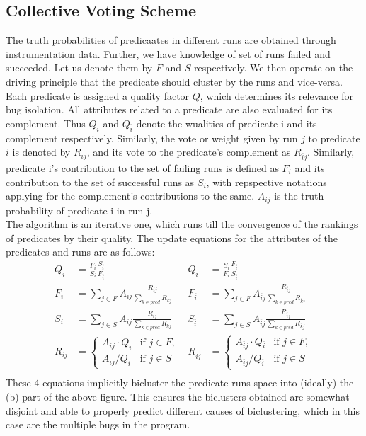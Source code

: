 \documentclass[a4paper,10pt, margin=0.75in]{article}
\begin{document}
\subsection{Collective Voting Scheme}
The truth probabilities of predicaates in different runs are obtained through instrumentation data. Further, we have knowledge of set of runs failed and succeeded. Let us denote them by $F$ and $S$ respectively. We then operate on the driving principle that the predicate should cluster by the runs and vice-versa.\\
Each predicate is assigned a quality factor $Q$, which determines its relevance for bug isolation. All attributes related to a predicate are also evaluated for its complement. Thus $Q_i$ and $Q_\overline{i}$ denote the wualities of predicate i and its complement respectively. Similarly, the vote or weight given by run $j$ to predicate $i$ is denoted by $R_{ij}$, and its vote to the predicate's complement as $R_{\overline{i}j}$. Similarly, predicate i's contribution to the set of failing runs is defined as $F_i$ and its contribution to the set of successful runs as $S_i$, with repspective notations applying for the complement's contributions to the same. $A_{ij}$ is the truth probability of predicate i in run j.\\
The algorithm is an iterative one, which runs till the convergence of the rankings of predicates by their quality. The update equations for the attributes of the predicates and runs are as follows:
$$
\begin{aligned}
    Q_i&=\frac{F_i}{S_i}\frac{S_\overline{i}}{F_\overline{i}} & Q_\overline{i}&=\frac{S_i}{F_i}\frac{F_\overline{i}}{S_\overline{i}}\\
    F_i&=\sum_{j\in F}A_{ij}\frac{R_{ij}}{\sum_{k\in pred}R_{kj}} & F_\overline{i}&=\sum_{j\in F}A_{\overline{i}j}\frac{R_{\overline{i}j}}{\sum_{k\in pred}R_{\overline{k}j}}\\
    S_i&=\sum_{j\in S}A_{ij}\frac{R_{ij}}{\sum_{k\in pred}R_{kj}} & S_\overline{i}&=\sum_{j\in S}A_{\overline{i}j}\frac{R_{\overline{i}j}}{\sum_{k\in pred}R_{\overline{k}j}}\\
    R_{ij}&=\begin{cases}
        A_{ij}\cdot Q_i & \text{if } j\in F,\\
        A_{ij}/Q_i & \text{if } j\in S
    \end{cases} & R_{\overline{i}j}&=\begin{cases}
        A_{\overline{i}j}\cdot Q_\overline{i} & \text{if } j\in F,\\
        A_{\overline{i}j}/Q_\overline{i} & \text{if } j\in S
    \end{cases}\\
\end{aligned}
$$
These 4 equations implicitly bicluster the predicate-runs space into (ideally) the (b) part of the above figure. This ensures the biclusters obtained are somewhat disjoint and able to properly predict different causes of biclustering, which in this case are the multiple bugs in the program.
\end{document}
